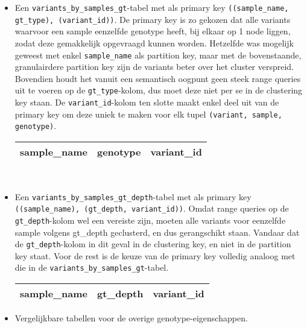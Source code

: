 \begin{itemize}
\begin{itemize}
\item Een \texttt{variants\_by\_samples\_gt}-tabel met als primary key \texttt{((sample\_name, gt\_type), (variant\_id))}. De primary key is zo gekozen dat alle variants waarvoor een sample eenzelfde genotype heeft, bij elkaar op 1 node liggen, zodat deze gemakkelijk opgevraagd kunnen worden. Hetzelfde was mogelijk geweest met enkel \texttt{sample\_name} als partition key, maar met de bovenstaande, granulairdere partition key zijn de variants beter over het cluster verspreid. Bovendien houdt het vanuit een semantisch oogpunt geen steek range queries uit te voeren op de \texttt{gt\_type}-kolom, dus moet deze niet per se in de clustering key staan. De \texttt{variant\_id}-kolom ten slotte maakt enkel deel uit van de primary key om deze uniek te maken voor elk tupel \texttt{(variant, sample, genotype)}.\\

\begin{table}[!htbp]
\begin{tabular}{@{}|l|l|l|@{}}
\toprule
\color{green} sample\_name & \color{green} genotype & \color{red} variant\_id \\ \bottomrule
\end{tabular}\\
\end{table}

\item Een \texttt{variants\_by\_samples\_gt\_depth}-tabel met als primary key \texttt{((sample\_name), (gt\_depth, variant\_id))}. Omdat range queries op de \texttt{gt\_depth}-kolom wel een vereiste zijn, moeten alle variants voor eenzelfde sample volgens gt\_depth geclusterd, en dus gerangschikt staan. Vandaar dat de \texttt{gt\_depth}-kolom in dit geval in de clustering key, en niet in de partition key staat. Voor de rest is de keuze van de primary key volledig analoog met die in de \texttt{variants\_by\_samples\_gt}-tabel.

\begin{table}[!htbp]
\begin{tabular}{@{}|l|l|l|@{}}
\toprule
\color{green} sample\_name & \color{red} gt\_depth & \color{red} variant\_id \\ \bottomrule
\end{tabular}
\end{table}

\item Vergelijkbare tabellen voor de overige genotype-eigenschappen.

\end{itemize}


\end{itemize}

